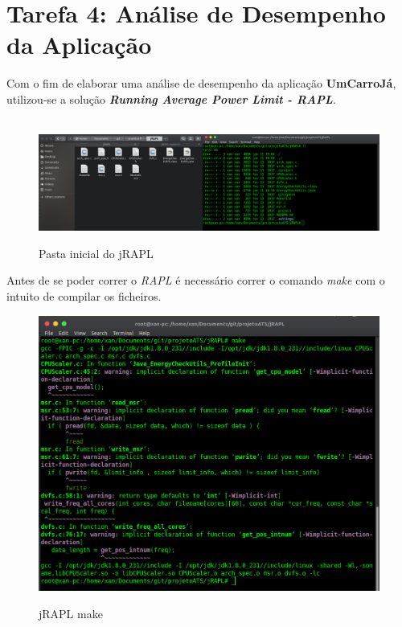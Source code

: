 \vspace{1cm}
\section{Tarefa 4: Análise de Desempenho da Aplicação}

Com o fim de elaborar uma análise de desempenho da aplicação \textbf{UmCarroJá}, utilizou-se a solução \textit{\textbf{Running Average Power Limit - RAPL}}.

\begin{figure}[H]
    \hbox{\hspace{-8em} \includegraphics[width=1.5\textwidth]{images/rapl_inicial.png}}
    \label{fig47}
    \caption{Pasta inicial do jRAPL}
\end{figure}

\par Antes de se poder correr o \textit{RAPL} é necessário correr o comando \textit{make} com o intuito de compilar os ficheiros.\newline

\begin{figure}[H]
    \centering
    \includegraphics[scale=0.27]{images/rapl_make.png}
    \label{fig48}
    \caption{jRAPL make}
\end{figure}


